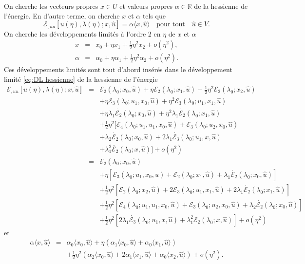 \documentclass{article}
\begin{document}
On cherche les vecteurs propres $x \in U$ et valeurs propres $\alpha \in
\mathbb{R}$ de la hessienne de l'énergie. En d'autre terme, on cherche $x$
et $\alpha$ tels que
\begin{equation}
  \mathcal{E}_{, u  u} [u (\eta), λ (\eta) ; x, \hat{u}] =
  \alpha \langle x, \hat{u} \rangle \quad \text{pour tout} \quad \hat{u} \in
  V.
\end{equation}
On cherche les développements limités à l'ordre 2 en $\eta$ de $x$
et $\alpha$
\begin{eqnarray*}
  x & = & x_0 + \eta x_1 + \tfrac{1}{2} \eta^2 x_2 + o (\eta^2),\\
  \alpha & = & \alpha_0 + \eta \alpha_1 + \tfrac{1}{2} \eta^2 \alpha_2 + o
  (\eta^2) .
\end{eqnarray*}
Ces développements limités sont tout d'abord insérés dans le
développement limité \eqref{eq:DL hessienne} de la hessienne de
l'énergie
\begin{eqnarray*}
  \mathcal{E}_{, u  u} [u (\eta), λ (\eta) ; x, \hat{u}] & = &
  \mathcal{E}_2 (λ_0 ; x_0, \hat{u}) + \eta \mathcal{E}_2 (λ_0 ;
  x_1, \hat{u}) + \tfrac{1}{2} \eta^2 \mathcal{E}_2 (λ_0 ; x_2,
  \hat{u})\\
  &  & + \eta \mathcal{E}_3 (λ_0 ; u_1, x_0, \hat{u}) + \eta^2
  \mathcal{E}_3 (λ_0 ; u_1, x_1, \hat{u})\\
  &  & + \eta λ_1  \dot{\mathcal{E}_2} (λ_0 ; x_0, \hat{u}) +
  \eta^2 λ_1  \dot{\mathcal{E}_2} (λ_0 ; x_1, \hat{u})\\
  &  & + \tfrac{1}{2} \eta^2  [\mathcal{E}_4 (λ_0 ; u_1, u_1, x_0,
  \hat{u})  +\mathcal{E}_3 (λ_0 ; u_2, x_0, \hat{u})\\
  &  & + λ_2  \dot{\mathcal{E}_2} (λ_0 ; x_0, \hat{u}) + 2
  λ_1  \dot{\mathcal{E}_3} (λ_0 ; u_1, x, \hat{u})\\
  &  & + λ_1^2  \ddot{\mathcal{E}_2} (λ_0 ; x, \hat{u})
  ] + o (\eta^2)\\
  & = & \mathcal{E}_2 (λ_0 ; x_0, \hat{u})\\
  &  & + \eta [\mathcal{E}_3 (λ_0 ; u_1, x_0, \hat{u}) +\mathcal{E}_2
  (λ_0 ; x_1, \hat{u}) + λ_1  \dot{\mathcal{E}_2} (λ_0 ;
  x_0, \hat{u})]\\
  &  & + \tfrac{1}{2} \eta^2  [\mathcal{E}_2 (λ_0 ; x_2, \hat{u}) +
  2\mathcal{E}_3 (λ_0 ; u_1, x_1, \hat{u}) + 2 λ_1
  \dot{\mathcal{E}_2} (λ_0 ; x_1, \hat{u})]\\
  &  & + \tfrac{1}{2} \eta^2  [\mathcal{E}_4 (λ_0 ; u_1, u_1, x_0,
  \hat{u}) +\mathcal{E}_3 (λ_0 ; u_2, x_0, \hat{u}) + λ_2
  \dot{\mathcal{E}_2} (λ_0 ; x_0, \hat{u})]\\
  &  & + \tfrac{1}{2} \eta^2  [2 λ_1  \dot{\mathcal{E}_3} (λ_0 ;
  u_1, x, \hat{u}) + λ_1^2  \ddot{\mathcal{E}_2} (λ_0 ; x,
  \hat{u})] + o (\eta^2)
\end{eqnarray*}
et
\begin{eqnarray*}
  \alpha \langle x, \hat{u} \rangle & = & \alpha_0  \langle x_0, \hat{u}
  \rangle + \eta (\alpha_1 \langle x_0, \hat{u} \rangle + \alpha_0 \langle
  x_1, \hat{u} \rangle)\\
  &  & + \tfrac{1}{2} \eta^2  (\alpha_2 \langle x_0, \hat{u} \rangle + 2
  \alpha_1 \langle x_1, \hat{u} \rangle + \alpha_0 \langle x_2, \hat{u}
  \rangle) + o (\eta^2) .
\end{eqnarray*}
\end{document}
